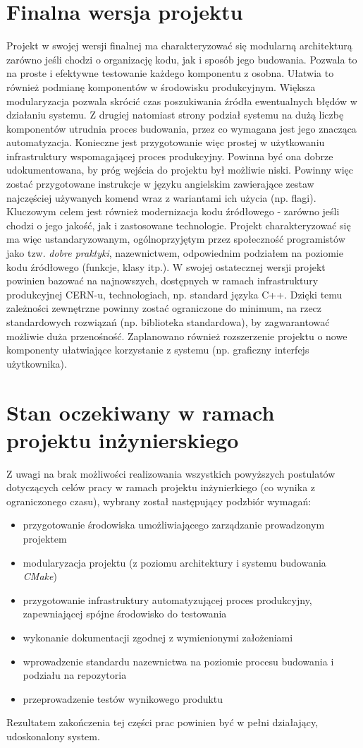 \section{Finalna wersja projektu}
Projekt w swojej wersji finalnej ma charakteryzować się modularną architekturą zarówno jeśli chodzi o organizację kodu, jak i sposób jego budowania. Pozwala to na proste i efektywne testowanie każdego komponentu z osobna. Ułatwia to również podmianę komponentów w środowisku produkcyjnym. Większa modularyzacja pozwala skrócić czas poszukiwania źródła ewentualnych błędów w działaniu systemu. Z drugiej natomiast strony podział systemu na dużą liczbę komponentów utrudnia proces budowania, przez co wymagana jest jego znacząca automatyzacja. Konieczne jest przygotowanie więc prostej w użytkowaniu infrastruktury wspomagającej proces produkcyjny. Powinna być ona dobrze udokumentowana, by próg wejścia do projektu był możliwie niski. Powinny więc zostać przygotowane instrukcje w języku angielskim zawierające zestaw najczęściej używanych komend wraz z wariantami ich użycia (np. flagi). Kluczowym celem jest również modernizacja kodu źródłowego - zarówno jeśli chodzi o jego jakość, jak i zastosowane technologie. Projekt charakteryzować się ma więc ustandaryzowanym, ogólnoprzyjętym przez społeczność programistów jako tzw. \textit{dobre praktyki}, nazewnictwem, odpowiednim podziałem na poziomie kodu źródłowego (funkcje, klasy itp.). W swojej ostatecznej wersji projekt powinien bazować na najnowszych, dostępnych w ramach infrastruktury produkcyjnej CERN-u, technologiach, np. standard języka C++. Dzięki temu zależności zewnętrzne powinny zostać ograniczone do minimum, na rzecz standardowych rozwiązań (np. biblioteka standardowa), by zagwarantować możliwie duża przenośność. Zaplanowano również rozszerzenie projektu o nowe komponenty ułatwiające korzystanie z systemu (np. graficzny interfejs użytkownika).

\section{Stan oczekiwany w ramach projektu inżynierskiego}
Z uwagi na brak możliwości realizowania wszystkich powyższych postulatów dotyczących celów pracy w ramach projektu inżynierkiego (co wynika z ograniczonego czasu), wybrany został następujący podzbiór wymagań:
\begin{itemize}
\item przygotowanie środowiska umożliwiającego zarządzanie prowadzonym projektem
\item modularyzacja projektu (z poziomu architektury i systemu budowania \textit{CMake})
\item przygotowanie infrastruktury automatyzującej proces produkcyjny, zapewniającej spójne środowisko do testowania
\item wykonanie dokumentacji zgodnej z wymienionymi założeniami
\item wprowadzenie standardu nazewnictwa na poziomie procesu budowania i podziału na repozytoria
\item przeprowadzenie testów wynikowego produktu
\end{itemize}
Rezultatem zakończenia tej części prac powinien być w pełni działający, udoskonalony system.



